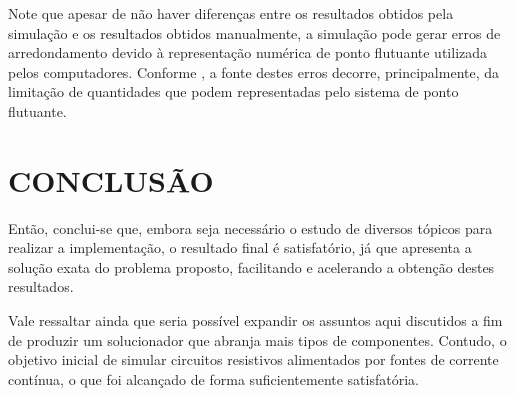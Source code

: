 \documentclass[twocolumn, 10pt]{extarticle}
\begin{document}
Note que apesar de não haver diferenças entre os resultados obtidos pela simulação e os resultados obtidos manualmente, a simulação pode gerar erros de arredondamento devido à representação numérica de ponto flutuante utilizada pelos computadores. Conforme \cite{chapra}, a fonte destes erros decorre, principalmente, da limitação de quantidades que podem representadas pelo sistema de ponto flutuante.
\section{CONCLUSÃO}

Então, conclui-se que, embora seja necessário o estudo de diversos tópicos para realizar a implementação, o resultado final é satisfatório, já que apresenta a solução exata do problema proposto, facilitando e acelerando a obtenção destes resultados. 

Vale ressaltar ainda que seria possível expandir os assuntos aqui discutidos a fim de produzir um solucionador que abranja mais tipos de componentes. Contudo, o objetivo inicial de simular circuitos resistivos alimentados por fontes de corrente contínua, o que foi alcançado de forma suficientemente satisfatória.

\renewcommand{\refname}{REFERÊNCIAS}

\end{document}
